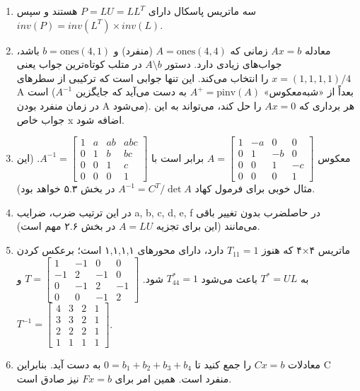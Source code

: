 \documentclass[12pt,a4paper]{article}
\begin{document}
{\begin{enumerate}
			\item سه ماتریس پاسکال دارای $P=LU=LL^T$ هستند و سپس $inv(P)=inv(L^T) \times inv(L)$.
			
			\item معادله $Ax=b$ زمانی که $A=\text{ones}(4,4)$ (منفرد) و $b=\text{ones}(4,1)$ باشد، جواب‌های زیادی دارد. دستور $A \setminus b$ در متلب کوتاه‌ترین جواب یعنی $x=(1,1,1,1)/4$ را انتخاب می‌کند. این تنها جوابی است که ترکیبی از سطرهای A است (بعداً از «شبه‌معکوس» $A^+ = \text{pinv}(A)$ به دست می‌آید که جایگزین $A^{-1}$ در زمان منفرد بودن A می‌شود). هر برداری که $Ax=0$ را حل کند، می‌تواند به این جواب خاص x اضافه شود.
			
			\item معکوس $A = \begin{bmatrix} 1 & -a & 0 & 0 \\ 0 & 1 & -b & 0 \\ 0 & 0 & 1 & -c \\ 0 & 0 & 0 & 1 \end{bmatrix}$ برابر است با $A^{-1} = \begin{bmatrix} 1 & a & ab & abc \\ 0 & 1 & b & bc \\ 0 & 0 & 1 & c \\ 0 & 0 & 0 & 1 \end{bmatrix}$. (این مثال خوبی برای فرمول کهاد $A^{-1}=C^T/\det A$ در بخش ۵.۳ خواهد بود).
			
			\item در این ترتیب ضرب، ضرایب a, b, c, d, e, f در حاصلضرب بدون تغییر باقی می‌مانند (این برای تجزیه $A=LU$ در بخش ۲.۶ مهم است).
			
			\item ماتریس ۴×۴ که هنوز $T_{11}=1$ دارد، دارای محورهای ۱,۱,۱,۱ است؛ برعکس کردن به $T^*=UL$ باعث می‌شود $T^*_{44}=1$ شود.
			$T = \begin{bmatrix} 1 & -1 & 0 & 0 \\ -1 & 2 & -1 & 0 \\ 0 & -1 & 2 & -1 \\ 0 & 0 & -1 & 2 \end{bmatrix}$ و $T^{-1} = \begin{bmatrix} 4 & 3 & 2 & 1 \\ 3 & 3 & 2 & 1 \\ 2 & 2 & 2 & 1 \\ 1 & 1 & 1 & 1 \end{bmatrix}$.
			
			\item معادلات $Cx=b$ را جمع کنید تا $0 = b_1+b_2+b_3+b_4$ به دست آید. بنابراین C منفرد است. همین امر برای $Fx=b$ نیز صادق است.
			

\end{enumerate}}
\end{document}
